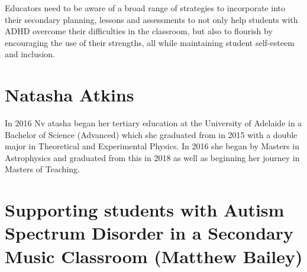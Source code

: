 \documentclass[twoside,14pt,a4paper,notitlepage]{memoir}
\begin{document}
Educators need to be aware of a broad range of strategies to incorporate into their secondary planning, lessons and assessments to not only help students with ADHD overcome their difficulties in the classroom, but also to flourish by encouraging the use of their strengths, all while maintaining student self-esteem and inclusion.

\section*{Natasha Atkins}

In 2016 Nv atasha began her tertiary education at the University of Adelaide in a Bachelor of Science (Advanced) which she graduated from in 2015 with a double major in Theoretical and Experimental Physics. In 2016 she began by Masters in Astrophysics and graduated from this in 2018 as well as beginning her journey in Masters of Teaching.



\section*{Supporting students with Autism Spectrum Disorder in a Secondary Music Classroom (Matthew Bailey)}
\label{aut:bailey}
\end{document}
